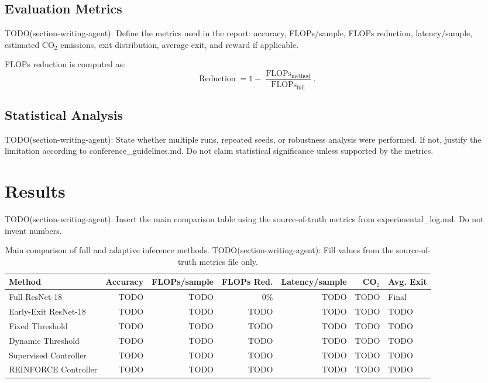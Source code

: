 \documentclass[10pt,twocolumn]{article}
\newcommand{\backbone}{ResNet-18}
\begin{document}
\subsection{Evaluation Metrics}

TODO(section-writing-agent): Define the metrics used in the report: accuracy, FLOPs/sample, FLOPs reduction, latency/sample, estimated CO$_2$ emissions, exit distribution, average exit, and reward if applicable.

FLOPs reduction is computed as:
\begin{equation}
    \operatorname{Reduction}
    =
    1 -
    \frac{\operatorname{FLOPs}_{\text{method}}}
    {\operatorname{FLOPs}_{\text{full}}}.
\end{equation}

\subsection{Statistical Analysis}

TODO(section-writing-agent): State whether multiple runs, repeated seeds, or robustness analysis were performed. If not, justify the limitation according to conference_guidelines.md. Do not claim statistical significance unless supported by the metrics.

\section{Results}

TODO(section-writing-agent): Insert the main comparison table using the source-of-truth metrics from experimental_log.md. Do not invent numbers.

\begin{table}[t]
\centering
\caption{Main comparison of full and adaptive inference methods. TODO(section-writing-agent): Fill values from the source-of-truth metrics file only.}
\label{tab:main-results}
\begin{tabular}{lrrrrrl}
\toprule
Method & Accuracy & FLOPs/sample & FLOPs Red. & Latency/sample & CO$_2$ & Avg. Exit \\
\midrule
Full \backbone{} & TODO & TODO & 0\% & TODO & TODO & Final \\
Early-Exit \backbone{} & TODO & TODO & TODO & TODO & TODO & TODO \\
Fixed Threshold & TODO & TODO & TODO & TODO & TODO & TODO \\
Dynamic Threshold & TODO & TODO & TODO & TODO & TODO & TODO \\
Supervised Controller & TODO & TODO & TODO & TODO & TODO & TODO \\
REINFORCE Controller & TODO & TODO & TODO & TODO & TODO & TODO \\
\bottomrule
\end{tabular}
\end{table}
\end{document}
